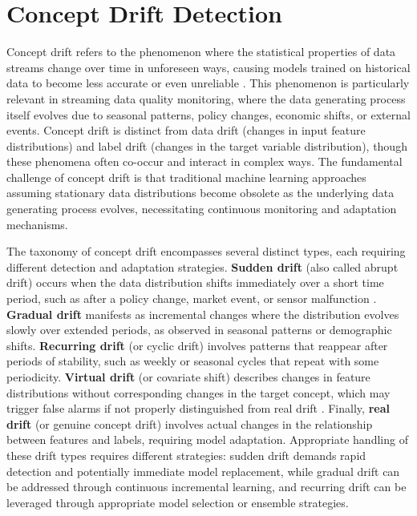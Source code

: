 \section{Concept Drift Detection}

Concept drift refers to the phenomenon where the statistical properties of data streams change over time in unforeseen ways, causing models trained on historical data to become less accurate or even unreliable \citep{gama2014survey, lu2018learning}. This phenomenon is particularly relevant in streaming data quality monitoring, where the data generating process itself evolves due to seasonal patterns, policy changes, economic shifts, or external events. Concept drift is distinct from data drift (changes in input feature distributions) and label drift (changes in the target variable distribution), though these phenomena often co-occur and interact in complex ways. The fundamental challenge of concept drift is that traditional machine learning approaches assuming stationary data distributions become obsolete as the underlying data generating process evolves, necessitating continuous monitoring and adaptation mechanisms.

The taxonomy of concept drift encompasses several distinct types, each requiring different detection and adaptation strategies. \textbf{Sudden drift} (also called abrupt drift) occurs when the data distribution shifts immediately over a short time period, such as after a policy change, market event, or sensor malfunction \citep{gama2014survey}. \textbf{Gradual drift} manifests as incremental changes where the distribution evolves slowly over extended periods, as observed in seasonal patterns or demographic shifts. \textbf{Recurring drift} (or cyclic drift) involves patterns that reappear after periods of stability, such as weekly or seasonal cycles that repeat with some periodicity. \textbf{Virtual drift} (or covariate shift) describes changes in feature distributions without corresponding changes in the target concept, which may trigger false alarms if not properly distinguished from real drift \citep{scar2025benchmark}. Finally, \textbf{real drift} (or genuine concept drift) involves actual changes in the relationship between features and labels, requiring model adaptation. Appropriate handling of these drift types requires different strategies: sudden drift demands rapid detection and potentially immediate model replacement, while gradual drift can be addressed through continuous incremental learning, and recurring drift can be leveraged through appropriate model selection or ensemble strategies.


